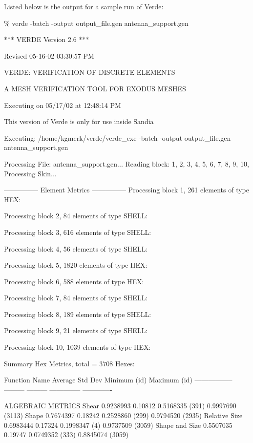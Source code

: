 \documentclass[10pt]{report}
\begin{document}
Listed below is the output for a sample run of Verde:


\begin{example}
\small{

\% verde -batch -output output_file.gen antenna_support.gen


		         *** VERDE Version 2.6 ***

		        Revised 05-16-02 03:30:57 PM

		VERDE: VERIFICATION OF DISCRETE ELEMENTS

		A MESH VERIFICATION TOOL FOR EXODUS MESHES

		      Executing on 05/17/02 at 12:48:14 PM

		This version of Verde is only for use inside Sandia

Executing: /home/kgmerk/verde/verde_exe -batch -output output_file.gen antenna_support.gen 

Processing File: antenna_support.gen...
Reading block: 1, 2, 3, 4, 5, 6, 7, 8, 9, 10,
Processing Skin...

---------------
Element Metrics
---------------
Processing block 1, 261 elements of type HEX:

Processing block 2, 84 elements of type SHELL:

Processing block 3, 616 elements of type SHELL:

Processing block 4, 56 elements of type SHELL:

Processing block 5, 1820 elements of type HEX:

Processing block 6, 588 elements of type HEX:

Processing block 7, 84 elements of type SHELL:

Processing block 8, 189 elements of type SHELL:

Processing block 9, 21 elements of type SHELL:

Processing block 10, 1039 elements of type HEX:


Summary Hex Metrics, total = 3708 Hexes:

   Function Name     Average    Std Dev    Minimum   (id)  Maximum  (id)
 -----------------  ---------  ---------  --------------  -------------

ALGEBRAIC METRICS
             Shear  0.9238993   0.10812   0.5168335 (391)  0.9997690 (3113)
             Shape  0.7674397   0.18242   0.2528860 (299)  0.9794520 (2935)
     Relative Size  0.6983444   0.17324   0.1998347 (4)  0.9737509 (3059)
    Shape and Size  0.5507035   0.19747   0.0749352 (333)  0.8845074 (3059)

}
\end{example}
\end{document}
